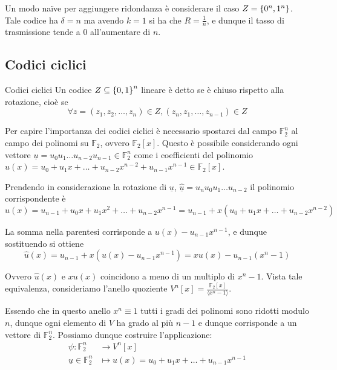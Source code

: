 Un modo naïve per aggiungere ridondanza è considerare il caso \(Z = \set{0^n, 1^n}\). Tale codice ha \(\delta = n\) ma avendo \(k = 1\) si ha che \(R = \frac{1}{n}\), e dunque il tasso di trasmissione tende a \(0\) all'aumentare di \(n\).

\subsection{Codici ciclici}

\begin{definition}{Codici ciclici}
  Un codice \(Z \subseteq \set{0,1}^n\) lineare è detto  se è chiuso rispetto alla rotazione, cioè se
  \[\forall z = (z_1, z_2,\ldots, z_n) \in Z, (z_n, z_1, \ldots, z_{n-1}) \in Z\]
\end{definition}

Per capire l'importanza dei codici ciclici è necessario spostarci dal campo \(\mathbb{F}_2^n\) al campo dei polinomi su \(\mathbb{F}_2\), ovvero \(\mathbb{F}_2[x]\).
Questo è possibile considerando ogni vettore \mbox{\(\underline{u} = u_0 u_1 \ldots u_{n-2} u_{n-1} \in \mathbb{F}_2^n\)} come i coefficienti del polinomio \(u(x) = u_0+u_1 x + \ldots+u_{n-2}x^{n-2}+ u_{n-1}x^{n-1} \in \mathbb{F}_2[x]\).

Prendendo in considerazione la rotazione di \(\underline{u}\), \(\underline{\hat{u}} = u_n u_0 u_1 \ldots u_{n-2}\) il polinomio corrispondente è
\[\hat{u}(x) = u_{n-1} + u_0 x + u_1 x^2 + \ldots + u_{n-2} x^{n-1} = u_{n-1} + x(u_0 + u_1 x + \ldots + u_{n-2} x^{n-2})\]

La somma nella parentesi corrisponde a \(u(x) - u_{n-1}x^{n-1}\), e dunque sostituendo si ottiene
\[\hat{u}(x) = u_{n-1} + x(u(x) - u_{n-1}x^{n-1}) = x u(x) - u_{n-1}(x^n-1)\]

Ovvero \(\hat{u}(x)\) e \(xu(x)\) coincidono a meno di un multiplo di \(x^n - 1\).
Vista tale equivalenza, consideriamo l'anello quoziente \(V^n[x] = \frac{\mathbb{F}_2[x]}{\langle x^n - 1\rangle}\).

Essendo che in questo anello \(x^n\equiv 1\) tutti i gradi dei polinomi sono ridotti modulo \(n\), dunque ogni elemento di \(V\) ha grado al più \(n-1\) e dunque corrisponde a un vettore di \(\mathbb{F}_2^n\).
Possiamo dunque costruire l'applicazione:
\[\begin{aligned}
  \psi: \mathbb{F}_2^n &\to V^n[x] \\
  \underline{u} \in \mathbb{F}_2^n &\mapsto u(x) = u_0 + u_1 x + \ldots + u_{n-1} x^{n-1}
\end{aligned}\]

